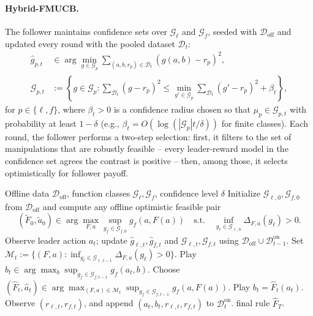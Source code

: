 \documentclass{article}
\newcommand{\cG}{\mathcal{G}}
\newcommand{\cD}{\mathcal{D}}
\newcommand{\cM}{\mathcal{M}}
\begin{document}
\paragraph{Hybrid-FMUCB.}
The follower maintains confidence sets over $\cG_\ell$ and $\cG_f$, seeded with $\cD_{\mathrm{off}}$ and updated every round with the pooled dataset $\cD_t$:
\begin{align*}
    \widehat g_{p,t} &\in \arg\min_{g\in\cG_p}\sum_{(a,b,r_p)\in\cD_t}(g(a,b)-r_p)^2, \\
    \cG_{p,t} &:= \left\{g\in\cG_p:\sum_{\cD_t}(g-r_p)^2 \le \min_{g'\in\cG_p}\sum_{\cD_t}(g'-r_p)^2+\beta_t\right\},
\end{align*}
for $p\in\{\ell,f\}$, where $\beta_t>0$ is a confidence radius chosen so that $\mu_p\in\cG_{p,t}$ with probability at least $1-\delta$ (e.g., $\beta_t=O(\log(|\cG_p|t/\delta))$ for finite classes). Each round, the follower performs a two-step selection: first, it filters to the set of manipulations that are robustly feasible -- every leader-reward model in the confidence set agrees the contrast is positive -- then, among those, it selects optimistically for follower payoff.

\begin{algorithm}[t]
\caption{Hybrid-FMUCB with Offline-Online Function Approximation}
\label{alg:hybrid-fmucb-fclass}
\begin{algorithmic}[1]
\Require Offline data $\cD_{\mathrm{off}}$, function classes $\cG_\ell,\cG_f$, confidence level $\delta$
\State Initialize $\cG_{\ell,0},\cG_{f,0}$ from $\cD_{\mathrm{off}}$ and compute any offline optimistic feasible pair
\[
(\widetilde F_0,\widetilde a_0)\in\arg\max_{F,a}\sup_{g_f\in\cG_{f,0}}g_f(a,F(a))
\quad\text{s.t.}\quad \inf_{g_\ell\in\cG_{\ell,0}}\Delta_{F,a}(g_\ell)>0.
\]
    \State Observe leader action $a_t$; update $\widehat g_{\ell,t},\widehat g_{f,t}$ and $\cG_{\ell,t},\cG_{f,t}$ using $\cD_{\mathrm{off}}\cup\cD^{\mathrm{on}}_{t-1}$.
    \State Set $\cM_t:=\{(F,a):\inf_{g_\ell\in\cG_{\ell,t-1}}\Delta_{F,a}(g_\ell)>0\}$.
    \If{$\cM_t=\emptyset$} 
        \State Play $b_t\in\arg\max_{b}\sup_{g_f\in\cG_{f,t-1}}g_f(a_t,b)$. 
    \Else
        \State Choose $(\widehat F_t,\widehat a_t)\in\arg\max_{(F,a)\in\cM_t}\sup_{g_f\in\cG_{f,t-1}}g_f(a,F(a))$.
        \State Play $b_t=\widehat F_t(a_t)$.
    \EndIf
    \State Observe $(r_{\ell,t},r_{f,t})$, and append $(a_t,b_t,r_{\ell,t},r_{f,t})$ to $\cD^{\mathrm{on}}_t$.
\EndFor
\State \Return final rule $\widehat F_T$.
\end{algorithmic}
\end{algorithm}
\end{document}
